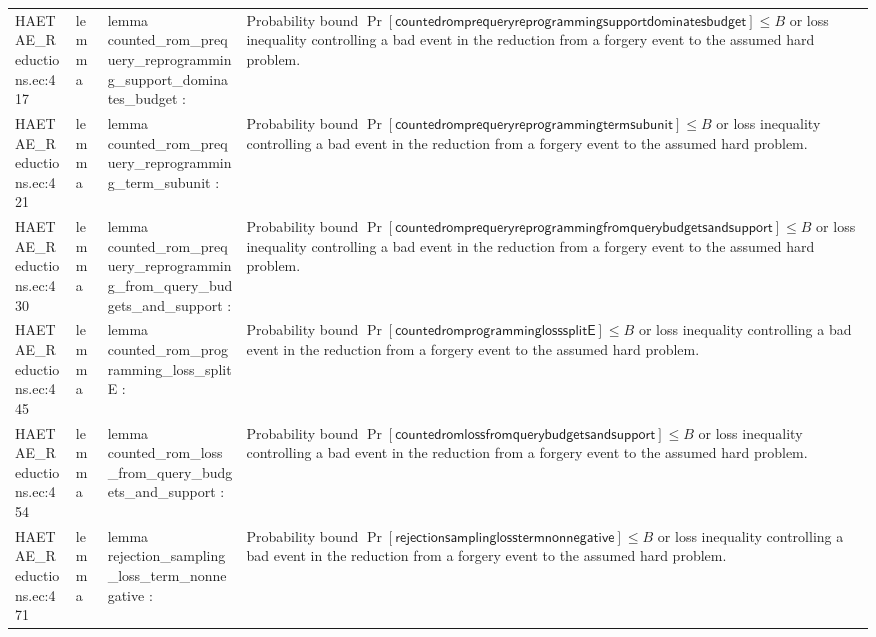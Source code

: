 \documentclass[10pt]{article}
\begin{document}
\begin{longtable}{L{0.11\textwidth}L{0.055\textwidth}L{0.385\textwidth}L{0.41\textwidth}}
HAETAE\_\allowbreak{}Reductions.\allowbreak{}ec:\allowbreak{}417 & lemma & {\ttfamily\scriptsize lemma counted\_\allowbreak{}rom\_\allowbreak{}prequery\_\allowbreak{}reprogramming\_\allowbreak{}support\_\allowbreak{}dominates\_\allowbreak{}budget :} & Probability bound $\Pr[\mathsf{countedromprequeryreprogrammingsupportdominatesbudget}]\le B$ or loss inequality controlling a bad event in the reduction from a forgery event to the assumed hard problem. \\
HAETAE\_\allowbreak{}Reductions.\allowbreak{}ec:\allowbreak{}421 & lemma & {\ttfamily\scriptsize lemma counted\_\allowbreak{}rom\_\allowbreak{}prequery\_\allowbreak{}reprogramming\_\allowbreak{}term\_\allowbreak{}subunit :} & Probability bound $\Pr[\mathsf{countedromprequeryreprogrammingtermsubunit}]\le B$ or loss inequality controlling a bad event in the reduction from a forgery event to the assumed hard problem. \\
HAETAE\_\allowbreak{}Reductions.\allowbreak{}ec:\allowbreak{}430 & lemma & {\ttfamily\scriptsize lemma counted\_\allowbreak{}rom\_\allowbreak{}prequery\_\allowbreak{}reprogramming\_\allowbreak{}from\_\allowbreak{}query\_\allowbreak{}budgets\_\allowbreak{}and\_\allowbreak{}support :} & Probability bound $\Pr[\mathsf{countedromprequeryreprogrammingfromquerybudgetsandsupport}]\le B$ or loss inequality controlling a bad event in the reduction from a forgery event to the assumed hard problem. \\
HAETAE\_\allowbreak{}Reductions.\allowbreak{}ec:\allowbreak{}445 & lemma & {\ttfamily\scriptsize lemma counted\_\allowbreak{}rom\_\allowbreak{}programming\_\allowbreak{}loss\_\allowbreak{}splitE :} & Probability bound $\Pr[\mathsf{countedromprogramminglosssplitE}]\le B$ or loss inequality controlling a bad event in the reduction from a forgery event to the assumed hard problem. \\
HAETAE\_\allowbreak{}Reductions.\allowbreak{}ec:\allowbreak{}454 & lemma & {\ttfamily\scriptsize lemma counted\_\allowbreak{}rom\_\allowbreak{}loss\_\allowbreak{}from\_\allowbreak{}query\_\allowbreak{}budgets\_\allowbreak{}and\_\allowbreak{}support :} & Probability bound $\Pr[\mathsf{countedromlossfromquerybudgetsandsupport}]\le B$ or loss inequality controlling a bad event in the reduction from a forgery event to the assumed hard problem. \\
HAETAE\_\allowbreak{}Reductions.\allowbreak{}ec:\allowbreak{}471 & lemma & {\ttfamily\scriptsize lemma rejection\_\allowbreak{}sampling\_\allowbreak{}loss\_\allowbreak{}term\_\allowbreak{}nonnegative :} & Probability bound $\Pr[\mathsf{rejectionsamplinglosstermnonnegative}]\le B$ or loss inequality controlling a bad event in the reduction from a forgery event to the assumed hard problem. \\

\end{longtable}
\end{document}
